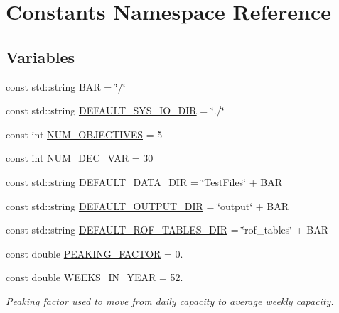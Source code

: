 \hypertarget{namespaceConstants}{}\section{Constants Namespace Reference}
\label{namespaceConstants}
\subsection*{Variables}
\begin{DoxyCompactItemize}
\item 
const std\+::string \mbox{\hyperlink{namespaceConstants_aaec5cbce5156ab790b3ae0563692fd92}{B\+AR}} = \char`\"{}/\char`\"{}
\item 
const std\+::string \mbox{\hyperlink{namespaceConstants_aba68b8131899cf13623e86c9d409ba91}{D\+E\+F\+A\+U\+L\+T\+\_\+\+S\+Y\+S\+\_\+\+I\+O\+\_\+\+D\+IR}} = \char`\"{}./\char`\"{}
\item 
const int \mbox{\hyperlink{namespaceConstants_a1e8f5e39c26fb06762a071611c7e432f}{N\+U\+M\+\_\+\+O\+B\+J\+E\+C\+T\+I\+V\+ES}} = 5
\item 
const int \mbox{\hyperlink{namespaceConstants_aa7919506e218b884dc934282a86594c1}{N\+U\+M\+\_\+\+D\+E\+C\+\_\+\+V\+AR}} = 30
\item 
const std\+::string \mbox{\hyperlink{namespaceConstants_a236b0a1c5920895bf4bdf11191bf414d}{D\+E\+F\+A\+U\+L\+T\+\_\+\+D\+A\+T\+A\+\_\+\+D\+IR}} = \char`\"{}Test\+Files\char`\"{} + B\+AR
\item 
const std\+::string \mbox{\hyperlink{namespaceConstants_ad340f8cb6d76396687295b5fc306e058}{D\+E\+F\+A\+U\+L\+T\+\_\+\+O\+U\+T\+P\+U\+T\+\_\+\+D\+IR}} = \char`\"{}output\char`\"{} + B\+AR
\item 
const std\+::string \mbox{\hyperlink{namespaceConstants_a377a23d7faa55e3e687bd0b844c3d3e1}{D\+E\+F\+A\+U\+L\+T\+\_\+\+R\+O\+F\+\_\+\+T\+A\+B\+L\+E\+S\+\_\+\+D\+IR}} = \char`\"{}rof\+\_\+tables\char`\"{} + B\+AR
\item 
const double \mbox{\hyperlink{namespaceConstants_abbfa799f216f5cc36a12c64b83140213}{P\+E\+A\+K\+I\+N\+G\+\_\+\+F\+A\+C\+T\+OR}} = 0.
\item 
const double \mbox{\hyperlink{namespaceConstants_a19e84af3cbc6e1318beb22408c2a1f2f}{W\+E\+E\+K\+S\+\_\+\+I\+N\+\_\+\+Y\+E\+AR}} = 52.
\begin{DoxyCompactList}\small\item\em Peaking factor used to move from daily capacity to average weekly capacity. \end{DoxyCompactList}\item 

\end{DoxyCompactItemize}
